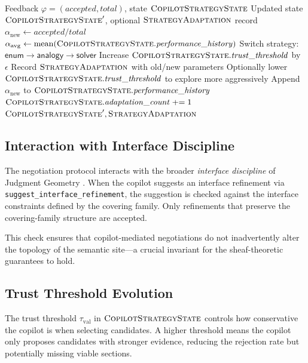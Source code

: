 \documentclass[11pt]{article}
\newcommand{\CSS}{\textsc{CopilotStrategyState}}
\newcommand{\SA}{\textsc{StrategyAdaptation}}
\newcommand{\trustval}{\tau_{\mathrm{val}}}
\newcommand{\accrate}{\alpha}
\newcommand{\feedback}{\varphi}
\begin{document}
\begin{algorithm}[t]
\caption{Strategy Adaptation}\label{alg:adapt}
\begin{algorithmic}[1]
\REQUIRE Feedback $\feedback = (\mathit{accepted}, \mathit{total})$,
         state $\CSS$
\ENSURE  Updated state $\CSS'$, optional $\SA$ record
\STATE $\accrate_{\mathrm{new}} \leftarrow
       \mathit{accepted} / \mathit{total}$
\STATE $\accrate_{\mathrm{avg}} \leftarrow
       \mathrm{mean}(\CSS.\mathit{performance\_history})$
\IF{$\accrate_{\mathrm{new}} < \accrate_{\mathrm{avg}} - \delta$}
    \STATE Switch strategy:
           $\mathsf{enum} \to \mathsf{analogy} \to \mathsf{solver}$
    \STATE Increase $\CSS.\mathit{trust\_threshold}$ by $\epsilon$
    \STATE Record $\SA$ with old/new parameters
\ELSIF{$\accrate_{\mathrm{new}} > \accrate_{\mathrm{avg}} + \delta$}
    \STATE Optionally lower $\CSS.\mathit{trust\_threshold}$
           to explore more aggressively
\ENDIF
\STATE Append $\accrate_{\mathrm{new}}$ to
       $\CSS.\mathit{performance\_history}$
\STATE $\CSS.\mathit{adaptation\_count} \mathrel{+}= 1$
\RETURN $\CSS', \SA$
\end{algorithmic}
\end{algorithm}

\subsection{Interaction with Interface Discipline}\label{sec:neg-interface}

The negotiation protocol interacts with the broader
\emph{interface discipline} of Judgment Geometry
\cite{jugeo-interface}.  When the copilot suggests an interface
refinement via \texttt{suggest\_interface\_refinement}, the
suggestion is checked against the interface constraints defined by
the covering family.  Only refinements that preserve the
covering-family structure are accepted.

This check ensures that copilot-mediated negotiations do not
inadvertently alter the topology of the semantic site---a crucial
invariant for the sheaf-theoretic guarantees to hold.

\subsection{Trust Threshold Evolution}\label{sec:neg-trust}

The trust threshold $\trustval$ in $\CSS$ controls how conservative
the copilot is when selecting candidates.  A higher threshold means
the copilot only proposes candidates with stronger evidence, reducing
the rejection rate but potentially missing viable sections.
\end{document}
